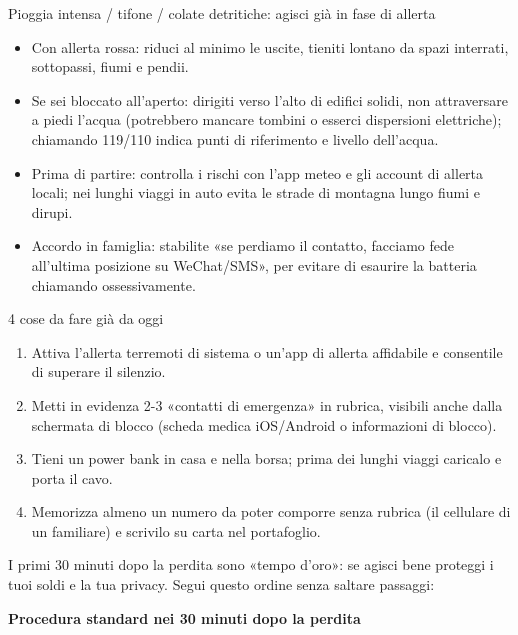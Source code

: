 \begin{tcbwarn}{Pioggia intensa / tifone / colate detritiche: agisci già in fase di allerta}
\begin{itemize}
  \item Con allerta rossa: riduci al minimo le uscite, tieniti lontano da spazi interrati, sottopassi, fiumi e pendii.
  \item Se sei bloccato all'aperto: dirigiti verso l'alto di edifici solidi, non attraversare a piedi l'acqua (potrebbero mancare tombini o esserci dispersioni elettriche); chiamando 119/110 indica punti di riferimento e livello dell'acqua.
  \item Prima di partire: controlla i rischi con l'app meteo e gli account di allerta locali; nei lunghi viaggi in auto evita le strade di montagna lungo fiumi e dirupi.
  \item Accordo in famiglia: stabilite «se perdiamo il contatto, facciamo fede all'ultima posizione su WeChat/SMS», per evitare di esaurire la batteria chiamando ossessivamente.
\end{itemize}

\end{tcbwarn}

\begin{tcbpractice}{4 cose da fare già da oggi}
\begin{enumerate}
  \item Attiva l'allerta terremoti di sistema o un'app di allerta affidabile e consentile di superare il silenzio.
  \item Metti in evidenza 2-3 «contatti di emergenza» in rubrica, visibili anche dalla schermata di blocco (scheda medica iOS/Android o informazioni di blocco).
  \item Tieni un power bank in casa e nella borsa; prima dei lunghi viaggi caricalo e porta il cavo.
  \item Memorizza almeno un numero da poter comporre senza rubrica (il cellulare di un familiare) e scrivilo su carta nel portafoglio.
\end{enumerate}

\end{tcbpractice}


I primi 30 minuti dopo la perdita sono «tempo d'oro»: se agisci bene proteggi i tuoi soldi e la tua privacy. Segui questo ordine senza saltare passaggi:

\textbf{Procedura standard nei 30 minuti dopo la perdita}\par


